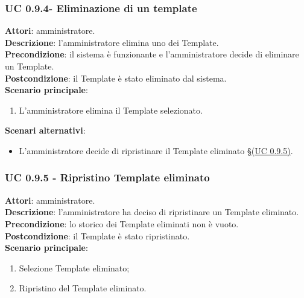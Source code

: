 \subsubsection{UC 0.9.4- Eliminazione di un template}{
	\label{uc0.9.4}
	\textbf{Attori}: amministratore. \\
	\textbf{Descrizione}: l'amministratore elimina uno dei Template. \\
	\textbf{Precondizione}: il sistema è funzionante e l'amministratore decide di eliminare un Template.	\\
	\textbf{Postcondizione}: il Template è stato eliminato dal sistema.	\\
	\textbf{Scenario principale}:
	\begin{enumerate}
		\item L’amministratore elimina il Template selezionato.
	\end{enumerate}
	\textbf{Scenari alternativi}:
	\begin{itemize}
		\item L'amministratore decide di ripristinare il Template eliminato \S\hyperref[uc0.9.5]{(UC 0.9.5)}.
	\end{itemize}
	}
\subsubsection{UC 0.9.5 - Ripristino Template eliminato}{
	\label{uc0.9.5}
	\textbf{Attori}: amministratore. \\
	\textbf{Descrizione}: l'amministratore ha deciso di ripristinare un Template eliminato. \\
	\textbf{Precondizione}: lo storico dei Template eliminati non è vuoto.	\\
	\textbf{Postcondizione}: il Template è stato ripristinato.	\\
	\textbf{Scenario principale}:
	\begin{enumerate}
		\item Selezione Template eliminato; 
		\item Ripristino del Template eliminato.
	\end{enumerate}
	}